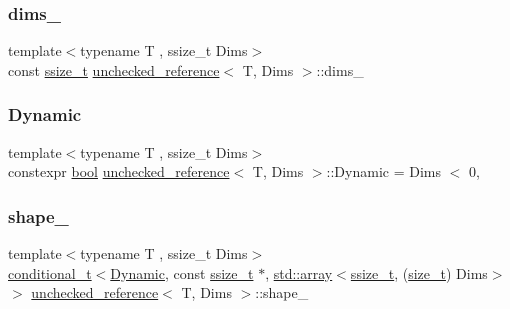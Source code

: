 \subsubsection{\texorpdfstring{dims\_}{dims\_}}
{\footnotesize\ttfamily template$<$typename T , ssize\+\_\+t Dims$>$ \\
const \mbox{\hyperlink{detail_2common_8h_ac430d16fc097b3bf0a7469cfd09decda}{ssize\+\_\+t}} \mbox{\hyperlink{classunchecked__reference}{unchecked\+\_\+reference}}$<$ T, Dims $>$\+::dims\+\_\+\hspace{0.3cm}{\ttfamily [protected]}}

\mbox{\label{classunchecked__reference_a4ad5525b6ab61ac1c5536df0249901b3}} 
\subsubsection{\texorpdfstring{Dynamic}{Dynamic}}
{\footnotesize\ttfamily template$<$typename T , ssize\+\_\+t Dims$>$ \\
constexpr \mbox{\hyperlink{asdl_8h_af6a258d8f3ee5206d682d799316314b1}{bool}} \mbox{\hyperlink{classunchecked__reference}{unchecked\+\_\+reference}}$<$ T, Dims $>$\+::Dynamic = Dims $<$ 0\hspace{0.3cm}{\ttfamily [static]}, {\ttfamily [protected]}}

\mbox{\label{classunchecked__reference_a9369fa82f1cef7ce910e906628d59e7c}} 
\subsubsection{\texorpdfstring{shape\_}{shape\_}}
{\footnotesize\ttfamily template$<$typename T , ssize\+\_\+t Dims$>$ \\
\mbox{\hyperlink{detail_2common_8h_acdb0eff728aec08ed6fff07d2885ea9d}{conditional\+\_\+t}}$<$\mbox{\hyperlink{classunchecked__reference_a4ad5525b6ab61ac1c5536df0249901b3}{Dynamic}}, const \mbox{\hyperlink{detail_2common_8h_ac430d16fc097b3bf0a7469cfd09decda}{ssize\+\_\+t}} $\ast$, \mbox{\hyperlink{_s_d_l__opengl__glext_8h_a52f38e7d822a46377fde7a02708eedb1}{std\+::array}}$<$\mbox{\hyperlink{detail_2common_8h_ac430d16fc097b3bf0a7469cfd09decda}{ssize\+\_\+t}}, (\mbox{\hyperlink{detail_2common_8h_a801d6a451a01953ef8cbae6feb6a3638}{size\+\_\+t}}) Dims$>$ $>$ \mbox{\hyperlink{classunchecked__reference}{unchecked\+\_\+reference}}$<$ T, Dims $>$\+::shape\+\_\+\hspace{0.3cm}{\ttfamily [protected]}}

